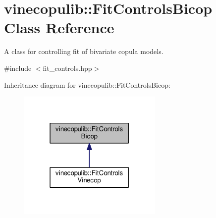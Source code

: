 \hypertarget{classvinecopulib_1_1_fit_controls_bicop}{}\section{vinecopulib\+:\+:Fit\+Controls\+Bicop Class Reference}
\label{classvinecopulib_1_1_fit_controls_bicop}


A class for controlling fit of bivariate copula models.  




{\ttfamily \#include $<$fit\+\_\+controls.\+hpp$>$}



Inheritance diagram for vinecopulib\+:\+:Fit\+Controls\+Bicop\+:\nopagebreak
\begin{figure}[H]
\begin{center}
\leavevmode
\includegraphics[width=199pt]{classvinecopulib_1_1_fit_controls_bicop__inherit__graph}
\end{center}
\end{figure}
